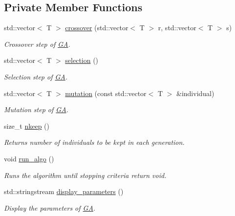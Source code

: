 \subsection*{Private Member Functions}
\begin{DoxyCompactItemize}
\item 
std\+::vector$<$ T $>$ \hyperlink{classea_1_1_solver_3_01_g_a_00_01_t_00_01_f_00_01_c_01_4_ad197350b0ef8bc73293fe31978702f02}{crossover} (std\+::vector$<$ T $>$ r, std\+::vector$<$ T $>$ s)
\begin{DoxyCompactList}\small\item\em Crossover step of \hyperlink{structea_1_1_g_a}{GA}. \end{DoxyCompactList}\item 
std\+::vector$<$ T $>$ \hyperlink{classea_1_1_solver_3_01_g_a_00_01_t_00_01_f_00_01_c_01_4_a1bc73c28211d7ba80665b286fbdea948}{selection} ()
\begin{DoxyCompactList}\small\item\em Selection step of \hyperlink{structea_1_1_g_a}{GA}. \end{DoxyCompactList}\item 
std\+::vector$<$ T $>$ \hyperlink{classea_1_1_solver_3_01_g_a_00_01_t_00_01_f_00_01_c_01_4_adde7de03b3c72d6b491a566699b6a4e4}{mutation} (const std\+::vector$<$ T $>$ \&individual)
\begin{DoxyCompactList}\small\item\em Mutation step of \hyperlink{structea_1_1_g_a}{GA}. \end{DoxyCompactList}\item 
size\+\_\+t \hyperlink{classea_1_1_solver_3_01_g_a_00_01_t_00_01_f_00_01_c_01_4_a42fe3561ccfab0dd666410e243d977e5}{nkeep} ()
\begin{DoxyCompactList}\small\item\em Returns number of individuals to be kept in each generation. \end{DoxyCompactList}\item 
void \hyperlink{classea_1_1_solver_3_01_g_a_00_01_t_00_01_f_00_01_c_01_4_aa03709c3636280a24879d01f9ad128ea}{run\+\_\+algo} ()
\begin{DoxyCompactList}\small\item\em Runs the algorithm until stopping criteria return void. \end{DoxyCompactList}\item 
std\+::stringstream \hyperlink{classea_1_1_solver_3_01_g_a_00_01_t_00_01_f_00_01_c_01_4_a36b4364bdb9a079aa327d6664d538167}{display\+\_\+parameters} ()
\begin{DoxyCompactList}\small\item\em Display the parameters of \hyperlink{structea_1_1_g_a}{GA}. \end{DoxyCompactList}\end{DoxyCompactItemize}
